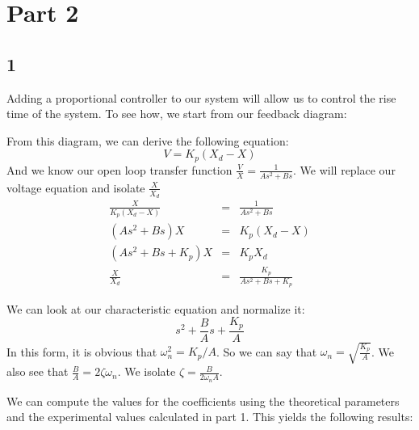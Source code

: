 \documentclass{article}
\begin{document}
\section*{Part 2}
\subsection*{1}
Adding a proportional controller to our system will allow us to control the rise time of the system. To see how, we start from our feedback diagram:

From this diagram, we can derive the following equation:
\begin{equation}
    V = K_p(X_d-X)
\end{equation}
And we know our open loop transfer function $\frac{V}{X}=\frac{1}{As^2+Bs}$. We will replace our voltage equation and isolate $\frac{X}{X_d}$
\begin{eqnarray*}
    \frac{X}{K_p(X_d-X)}&=&\frac{1}{As^2+Bs}\\
    (As^2+Bs)X &=& K_p(X_d-X)\\
    (As^2+Bs + K_p)X &=& K_pX_d\\
    \frac{X}{X_d} &=& \frac{K_p}{As^2+Bs + K_p}
\end{eqnarray*}

We can look at our characteristic equation and normalize it:
\begin{equation}
    s^2 + \frac{B}{A}s + \frac{K_p}{A}
\end{equation}
In this form, it is obvious that $\omega_n^2 = K_p/A$. So we can say that $\omega_n = \sqrt{\frac{K_p}{A}}$. We also see that $\frac{B}{A} = 2\zeta\omega_n$. We isolate $\zeta = \frac{B}{2\omega_nA}$.

We can compute the values for the coefficients using the theoretical parameters and the experimental values calculated in part 1. This yields the following results:
\end{document}
